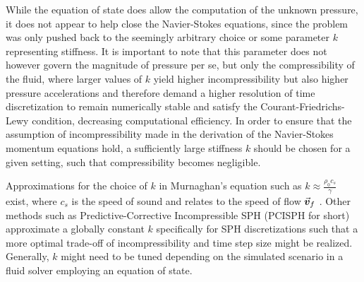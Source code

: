 While the equation of state does allow the computation of the unknown pressure, it does not appear to help close the Navier-Stokes equations, since the problem was only pushed back to the seemingly arbitrary choice or some parameter $k$ representing stiffness. It is important to note that this parameter does not however govern the magnitude of pressure per se, but only the compressibility of the fluid\autocite*{tutorial}, where larger values of $k$ yield higher incompressibility but also higher pressure accelerations and therefore demand a higher resolution of time discretization to remain numerically stable\autocite*{tutorial} and satisfy the Courant-Friedrichs-Lewy condition\autocite*{pcisph}, decreasing computational efficiency. In order to ensure that the assumption of incompressibility made in the derivation of the Navier-Stokes momentum equations hold, a sufficiently large stiffness $k$ should be chosen for a given setting, such that compressibility becomes negligible.

Approximations for the choice of $k$ in Murnaghan's equation such as $k\approx \frac{\rho_0 c_s}{\gamma}$ exist, where $c_s$ is the speed of sound and relates to the speed of flow $\vec{\bm{v}}_f$ \autocite*{wcsph}. Other methods such as Predictive-Corrective Incompressible SPH (PCISPH for short) approximate a globally constant $k$ specifically for SPH discretizations such that a more optimal trade-off of incompressibility and time step size might be realized. Generally, $k$ might need to be tuned depending on the simulated scenario in a fluid solver employing an equation of state.



